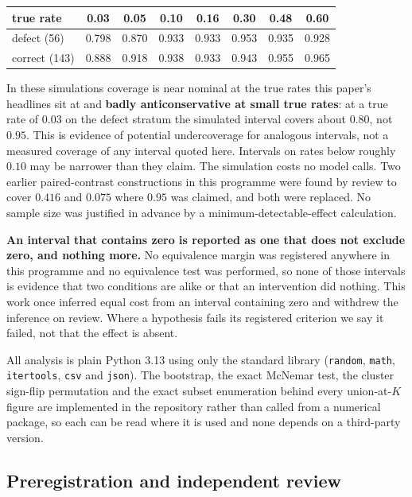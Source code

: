 \begin{center}\small
\footnotesize\setlength{\tabcolsep}{2.5pt}
\begin{tabular}{@{}lccccccc@{}}
\toprule
true rate & 0.03 & 0.05 & 0.10 & 0.16 & 0.30 & 0.48 & 0.60 \\
\midrule
defect (56) & 0.798 & 0.870 & 0.933 & 0.933 & 0.953 & 0.935 & 0.928 \\
correct (143) & 0.888 & 0.918 & 0.938 & 0.933 & 0.943 & 0.955 & 0.965 \\
\bottomrule
\end{tabular}
\end{center}

\noindent In these simulations coverage is near nominal at the true rates this paper's headlines
sit at and \textbf{badly anticonservative at small true rates}: at a true rate of $0.03$ on the
defect stratum the simulated interval covers about $0.80$, not $0.95$. This is evidence of
potential undercoverage for analogous intervals, not a measured coverage of any interval quoted
here. Intervals on rates below roughly $0.10$ may be narrower than they claim. The simulation
costs no model calls. Two earlier paired-contrast constructions in this programme were found by
review to cover $0.416$ and $0.075$ where $0.95$ was claimed, and both were replaced. No sample
size was justified in advance by a minimum-detectable-effect calculation.

\textbf{An interval that contains zero is reported as one that does not exclude zero, and nothing
more.} No equivalence margin was registered anywhere in this programme and no equivalence test was
performed, so none of those intervals is evidence that two conditions are alike or that an
intervention did nothing. This work once inferred equal cost from an interval containing zero and
withdrew the inference on review. Where a hypothesis fails its registered criterion we say it
failed, not that the effect is absent.

All analysis is plain Python 3.13 using only the standard library (\texttt{random},
\texttt{math}, \texttt{itertools}, \texttt{csv} and \texttt{json}). The bootstrap, the exact
McNemar test, the cluster sign-flip permutation and the exact subset enumeration behind every
union-at-$K$ figure are implemented in the repository rather than called from a numerical package,
so each can be read where it is used and none depends on a third-party version.

\subsection{Preregistration and independent review}
\label{sec:methods-review}

